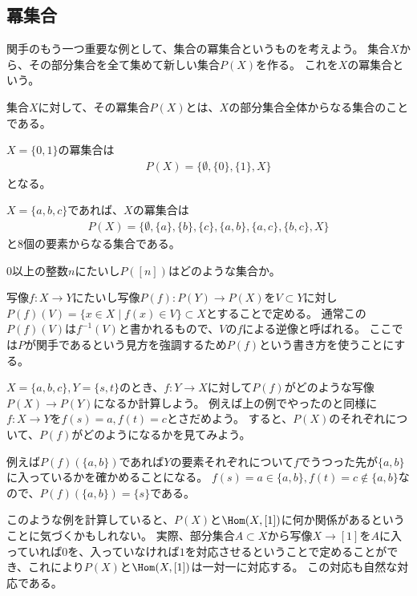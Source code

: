 \documentclass{jsarticle}
\begin{document}
\subsection{冪集合}
関手のもう一つ重要な例として、集合の冪集合というものを考えよう。
集合$X$から、その部分集合を全て集めて新しい集合$P(X)$を作る。
これを$X$の冪集合という。

\begin{dfn}[冪集合]
集合$X$に対して、その冪集合$P(X)$とは、$X$の部分集合全体からなる集合のことである。
\end{dfn}

\begin{eg}
$X=\{0,1\}$の冪集合は
\begin{align*}
P(X)=\{\emptyset, \{0\},\{1\},X\}
\end{align*}
となる。

$X=\{a,b,c\}$であれば、$X$の冪集合は
\begin{align*}
P(X)=\{\emptyset, \{a\}, \{b\}, \{c\}, \{a,b\}, \{a,c\}, \{b,c\}, X\}
\end{align*}
と$8$個の要素からなる集合である。
\end{eg}

\begin{prob}
$0$以上の整数$n$にたいし$P([n])$はどのような集合か。
\end{prob}


写像$f\colon X\to Y$にたいし写像$P(f)\colon P(Y)\to P(X)$を$V\subset Y$に対し$P(f)(V)=\{x\in X\mid f(x)\in V\}\subset X$とすることで定める。
通常この$P(f)(V)$は$f^{-1}(V)$と書かれるもので、$V$の$f$による逆像と呼ばれる。
ここでは$P$が関手であるという見方を強調するため$P(f)$という書き方を使うことにする。

\begin{prob}
$X=\{a,b,c\}, Y=\{s,t\}$のとき、$f:Y \to X$に対して$P(f)$がどのような写像$P(X) \to P(Y)$になるか計算しよう。
例えば上の例でやったのと同様に$f:X \to Y$を$f(s)=a, f(t)=c$とさだめよう。
すると、$P(X)$のそれぞれについて、$P(f)$がどのようになるかを見てみよう。

例えば$P(f)(\{a,b\})$であれば$Y$の要素それぞれについて$f$でうつった先が$\{a,b\}$に入っているかを確かめることになる。
$f(s)=a \in \{a,b\}, f(t)=c\notin\{a,b\}$なので、$P(f)(\{a,b\})=\{s\}$である。
\end{prob}

このような例を計算していると、$P(X)$と$\Hom(X,[1])$に何か関係があるということに気づくかもしれない。
実際、部分集合$A \subset X$から写像$X \to [1]$を$A$に入っていれば$0$を、入っていなければ$1$を対応させるということで定めることができ、これにより$P(X)$と$\Hom(X,[1])$は一対一に対応する。
この対応も自然な対応である。
\end{document}
